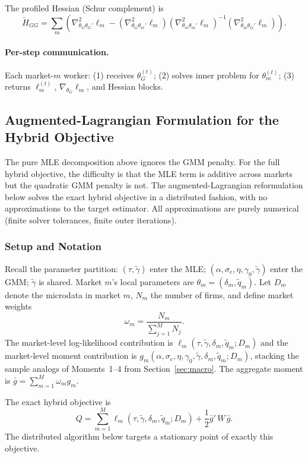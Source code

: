 \documentclass[11pt]{article}
\begin{document}
The profiled Hessian (Schur complement) is
\[
\tilde H_{GG} = \sum_m\left(\nabla^2_{\theta_G\theta_G'}\ell_m - (\nabla^2_{\theta_G\theta_m'}\ell_m)(\nabla^2_{\theta_m\theta_m'}\ell_m)^{-1}(\nabla^2_{\theta_m\theta_G'}\ell_m)\right).
\]

\paragraph{Per-step communication.} Each market-$m$ worker: (1) receives $\theta_G^{(t)}$; (2) solves inner problem for $\theta_m^{(t)}$; (3) returns $\ell_m^{(t)}$, $\nabla_{\theta_G}\ell_m$, and Hessian blocks.

\subsection{Augmented-Lagrangian Formulation for the Hybrid Objective}\label{sec:auglag}

The pure MLE decomposition above ignores the GMM penalty. For the full hybrid objective, the difficulty is that the MLE term is additive across markets but the quadratic GMM penalty is not. The augmented-Lagrangian reformulation below solves the exact hybrid objective in a distributed fashion, with no approximations to the target estimator. All approximations are purely numerical (finite solver tolerances, finite outer iterations).

\subsubsection{Setup and Notation}

Recall the parameter partition: $(\tau,\tilde\gamma)$ enter the MLE; $(\alpha,\sigma_e,\eta,\gamma_0,\tilde\gamma)$ enter the GMM; $\tilde\gamma$ is shared. Market $m$'s local parameters are $\theta_m = (\delta_m,\tilde q_m)$. Let $D_m$ denote the microdata in market $m$, $N_m$ the number of firms, and define market weights
\[
\omega_m = \frac{N_m}{\sum_{j=1}^M N_j}.
\]
The market-level log-likelihood contribution is $\ell_m(\tau,\tilde\gamma,\delta_m,\tilde q_m;D_m)$ and the market-level moment contribution is $g_m(\alpha,\sigma_e,\eta,\gamma_0,\tilde\gamma,\delta_m,\tilde q_m;D_m)$, stacking the sample analogs of Moments~1--4 from Section~\ref{sec:macro}. The aggregate moment is $\bar g = \sum_{m=1}^M \omega_m g_m$.

The exact hybrid objective is
\begin{equation}\label{eq:hybrid_exact}
Q = \sum_{m=1}^M \ell_m(\tau,\tilde\gamma,\delta_m,\tilde q_m;D_m) + \frac{1}{2}\bar g'\,W\,\bar g.
\end{equation}
The distributed algorithm below targets a stationary point of exactly this objective.
\end{document}
